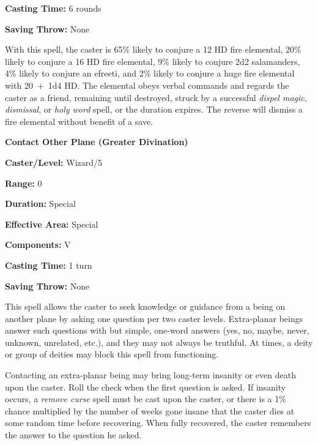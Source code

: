 \begin{multicols}{2}
\begin{minipage}{\columnwidth}
\noindent \textbf{Casting Time:} 6 rounds

\noindent \textbf{Saving Throw:} None

\end{minipage}

With this spell, the caster is 65\% likely to conjure a 12 HD fire elemental, 20\% likely to conjure a 16 HD fire elemental, 9\% likely to conjure 2d2 salamanders, 4\% likely to conjure an efreeti, and 2\% likely to conjure a huge fire elemental with 20~+~1d4 HD.  The elemental obeys verbal commands and regards the caster as a friend, remaining until destroyed, struck by a successful \textit{dispel magic}, \textit{dismissal}, or \textit{holy word} spell, or the duration expires.  The reverse will dismiss a fire elemental without benefit of a save.

\vspace{1em}

\noindent
\begin{minipage}{\columnwidth}

\noindent \textbf{Contact Other Plane (Greater Divination)}

\noindent \textbf{Caster/Level:} Wizard/5

\noindent \textbf{Range:} 0

\noindent \textbf{Duration:} Special

\noindent \textbf{Effective Area:} Special

\noindent \textbf{Components:} V

\noindent \textbf{Casting Time:} 1 turn

\noindent \textbf{Saving Throw:} None

\end{minipage}

This spell allows the caster to seek knowledge or guidance from a being on another plane by asking one question per two caster levels.  Extra-planar beings answer such questions with but simple, one-word answers (yes, no, maybe, never, unknown, unrelated, etc.), and they may not always be truthful.  At times, a deity or group of deities may block this spell from functioning.

Contacting an extra-planar being may bring long-term insanity or even death upon the caster.  Roll the check when the first question is asked.  If insanity occurs, a \textit{remove curse} spell must be cast upon the caster, or there is a 1\% chance multiplied by the number of weeks gone insane that the caster dies at some random time before recovering.  When fully recovered, the caster remembers the answer to the question he asked.

\end{multicols}


